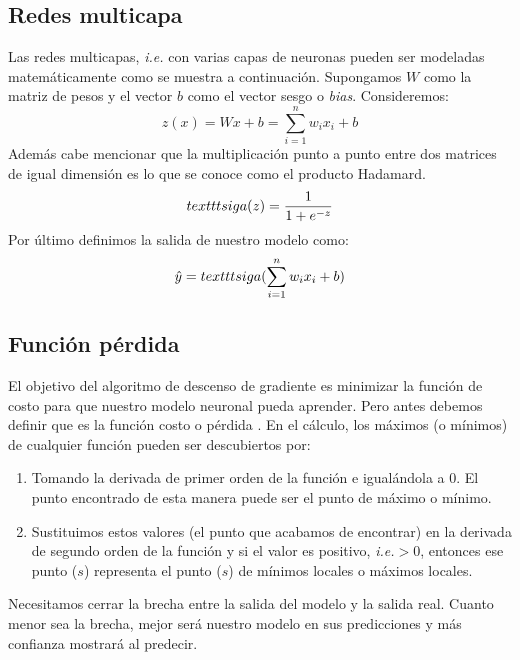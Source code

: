 \documentclass[a4paper,12pt]{article}
\begin{document}
\subsection{Redes multicapa}
Las redes multicapas, \textit{i.e.} con varias capas de neuronas pueden ser modeladas matemáticamente como se muestra a continuación.
Supongamos $W$ como la matriz de pesos y el vector $b$ como el vector sesgo o \textit{bias}.
Consideremos:
\begin{equation}
z(x)=Wx+b=\sum_{i=1}^{n}w_ix_i+b
\end{equation}
Además cabe mencionar que la multiplicación punto a punto entre dos matrices de igual dimensión es lo que se conoce como el producto Hadamard.
\begin{equation}
\\texttt{sig}a(z)=\frac{1}{1+e^{-z}}
\end{equation}
Por último definimos la salida de nuestro modelo como:
\begin{equation}
\hat{y}=\\texttt{sig}a(\sum_{i=1}^{n}w_ix_i+b)
\end{equation}

\subsection{Función pérdida}

El objetivo del algoritmo de descenso de gradiente es minimizar la función de costo para que nuestro modelo neuronal pueda aprender.
Pero antes debemos definir que es la función costo o pérdida \cite{sgd}.
En el cálculo, los máximos (o mínimos) de cualquier función pueden ser descubiertos por:
\begin{enumerate}
\item Tomando la derivada de primer orden de la función e igualándola a 0. El punto encontrado de esta manera puede ser el punto de máximo o mínimo.
\item Sustituimos estos valores (el punto que acabamos de encontrar) en la derivada de segundo orden de la función y si el valor es positivo, \textit{i.e.}$>0$, entonces ese punto ($s$) representa el punto ($s$) de mínimos locales o máximos locales.
\end{enumerate}

Necesitamos cerrar la brecha entre la salida del modelo y la salida real. Cuanto menor sea la brecha, mejor será nuestro modelo en sus predicciones y más confianza mostrará al predecir.
\end{document}
